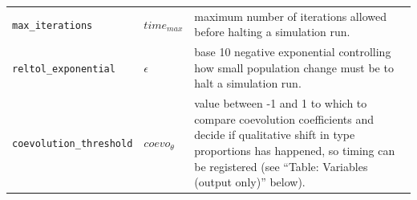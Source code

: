 \documentclass[
]{book}
\begin{document}
\begin{longtable}[]{@{}lll@{}}
\begin{minipage}[t]{0.27\columnwidth}\raggedright
\texttt{max\_iterations}\strut
\end{minipage} & \begin{minipage}[t]{0.25\columnwidth}\raggedright
\(time_{max}\)\strut
\end{minipage} & \begin{minipage}[t]{0.40\columnwidth}\raggedright
maximum number of iterations allowed before halting a simulation run.\strut
\end{minipage}\tabularnewline
\begin{minipage}[t]{0.27\columnwidth}\raggedright
\texttt{reltol\_exponential}\strut
\end{minipage} & \begin{minipage}[t]{0.25\columnwidth}\raggedright
\(\epsilon\)\strut
\end{minipage} & \begin{minipage}[t]{0.40\columnwidth}\raggedright
base 10 negative exponential controlling how small population change must be to halt a simulation run.\strut
\end{minipage}\tabularnewline
\begin{minipage}[t]{0.27\columnwidth}\raggedright
\texttt{coevolution\_threshold}\strut
\end{minipage} & \begin{minipage}[t]{0.25\columnwidth}\raggedright
\(coevo_{\theta}\)\strut
\end{minipage} & \begin{minipage}[t]{0.40\columnwidth}\raggedright
value between -1 and 1 to which to compare coevolution coefficients and decide if qualitative shift in type proportions has happened, so timing can be registered (see ``Table: Variables (output only)'' below).\strut
\end{minipage}\tabularnewline
\bottomrule
\end{longtable}
\end{document}
